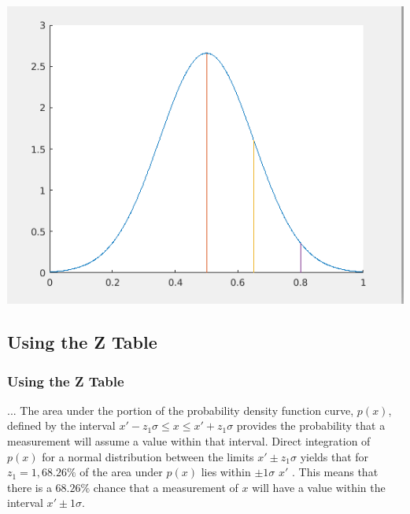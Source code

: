 \documentclass[fleqn]{beamer} %
\newcommand{\sectionIIsubsectionIIItitle}{Using the Z Table}
\begin{document}
			\begin{frame}
				\includegraphics[scale=.50]{images/lecture1_fig1.png}
			\end{frame}

		\subsection{\sectionIIsubsectionIIItitle}\label{sectionIIsubsectionIII}

			\begin{frame}
				\frametitle{\sectionIIsubsectionIIItitle}

				... The area under the portion of the probability density function curve, $p(x)$, defined by the interval $x'-z_1\sigma \leq x \leq x' +z_1\sigma$ provides the probability that a measurement will assume a value within that interval. Direct integration of $p(x)$ for a normal
				distribution between the limits $x'\pm z_1\sigma$ yields that for $z_1=1, 68.26\%$ of the area under $p(x)$ lies
				within $\pm 1\sigma$   $x'$ . This means that there is a $68.26\%$ chance that a measurement of $x$ will have a
				value within the interval $x'\pm 1\sigma$.
			
			\end{frame}		
\end{document}
